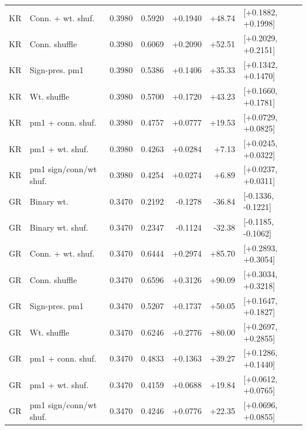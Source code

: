 \begin{tabular}{llrrrrl}
KR & Conn. + wt. shuf. & 0.3980 & 0.5920 & +0.1940 & +48.74 & [+0.1882, +0.1998] \\
KR & Conn. shuffle & 0.3980 & 0.6069 & +0.2090 & +52.51 & [+0.2029, +0.2151] \\
KR & Sign-pres. pm1 & 0.3980 & 0.5386 & +0.1406 & +35.33 & [+0.1342, +0.1470] \\
KR & Wt. shuffle & 0.3980 & 0.5700 & +0.1720 & +43.23 & [+0.1660, +0.1781] \\
KR & pm1 + conn. shuf. & 0.3980 & 0.4757 & +0.0777 & +19.53 & [+0.0729, +0.0825] \\
KR & pm1 + wt. shuf. & 0.3980 & 0.4263 & +0.0284 & +7.13 & [+0.0245, +0.0322] \\
KR & pm1 sign/conn/wt shuf. & 0.3980 & 0.4254 & +0.0274 & +6.89 & [+0.0237, +0.0311] \\
GR & Binary wt. & 0.3470 & 0.2192 & -0.1278 & -36.84 & [-0.1336, -0.1221] \\
GR & Binary wt. shuf. & 0.3470 & 0.2347 & -0.1124 & -32.38 & [-0.1185, -0.1062] \\
GR & Conn. + wt. shuf. & 0.3470 & 0.6444 & +0.2974 & +85.70 & [+0.2893, +0.3054] \\
GR & Conn. shuffle & 0.3470 & 0.6596 & +0.3126 & +90.09 & [+0.3034, +0.3218] \\
GR & Sign-pres. pm1 & 0.3470 & 0.5207 & +0.1737 & +50.05 & [+0.1647, +0.1827] \\
GR & Wt. shuffle & 0.3470 & 0.6246 & +0.2776 & +80.00 & [+0.2697, +0.2855] \\
GR & pm1 + conn. shuf. & 0.3470 & 0.4833 & +0.1363 & +39.27 & [+0.1286, +0.1440] \\
GR & pm1 + wt. shuf. & 0.3470 & 0.4159 & +0.0688 & +19.84 & [+0.0612, +0.0765] \\
GR & pm1 sign/conn/wt shuf. & 0.3470 & 0.4246 & +0.0776 & +22.35 & [+0.0696, +0.0855] \\
\bottomrule
\end{tabular}

